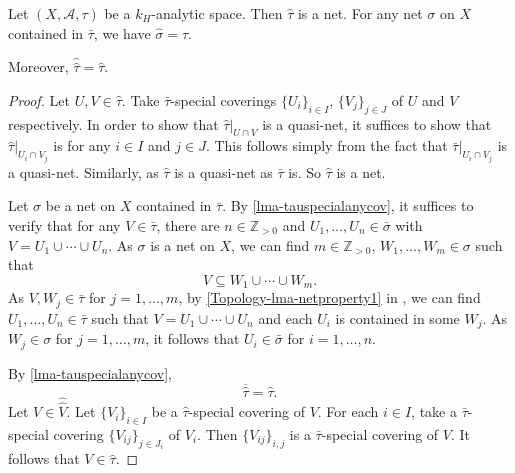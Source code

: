 \begin{proposition}\label{prop-tauhatbasic}
    Let  $(X,\mathcal{A},\tau)$ be a $k_H$-analytic space. Then $\hat{\tau}$ is a net. For any net $\sigma$ on $X$ contained in $\bar{\tau}$, we have $\hat{\sigma}=\hat{\tau}$.

    Moreover, $\hat{\hat{\tau}}=\hat{\tau}$.
\end{proposition}
\begin{proof}
    Let $U,V\in \hat{\tau}$. Take $\bar{\tau}$-special coverings $\{U_i\}_{i\in I}$, $\{V_j\}_{j\in J}$ of $U$ and $V$ respectively. In order to show that $\hat{\tau}|_{U\cap V}$ is a quasi-net, it suffices to show that $\hat{\tau}|_{U_i\cap V_j}$ is for any $i\in I$ and $j\in J$. This follows simply from the fact that $\bar{\tau}|_{U_i\cap V_j}$ is a quasi-net. Similarly, as $\hat{\tau}$ is a quasi-net as $\bar{\tau}$ is. So $\hat{\tau}$ is a net.

    Let $\sigma$ be a net on $X$ contained in $\bar{\tau}$. By \cref{lma-tauspecialanycov}, it suffices to verify that for any $V\in \bar{\tau}$, there are $n\in \mathbb{Z}_{>0}$ and $U_1,\ldots,U_n\in \bar{\sigma}$ with $V=U_1\cup \cdots \cup U_n$. As $\sigma$ is a net on $X$, we can find $m\in \mathbb{Z}_{>0}$, $W_1,\ldots,W_m\in \sigma$ such that
    \[
        V\subseteq W_1\cup \cdots\cup W_m.  
    \]
    As $V,W_j\in \bar{\tau}$ for $j=1,\ldots,m$, by \cref{Topology-lma-netproperty1} in , we can find $U_1,\ldots,U_n\in \bar{\tau}$ such that $V=U_1\cup\cdots\cup U_n$ and each $U_i$ is contained in some $W_j$. As $W_j\in \sigma$ for $j=1,\ldots,m$, it follows that $U_i\in \bar{\sigma}$ for $i=1,\ldots,n$.

    By \cref{lma-tauspecialanycov}, 
    \[
      \overline{\hat{\tau}} =\hat{\tau}. 
    \]
    Let $V\in \hat{\hat{V}}$.
    Let $\{V_i\}_{i\in I}$ be a $\hat{\tau}$-special covering of $V$. For each $i\in I$, take a $\bar{\tau}$-special covering $\{V_{ij}\}_{j\in J_i}$ of $V_i$. Then $\{V_{ij}\}_{i,j}$ is a $\bar{\tau}$-special covering of $V$. It follows that $V\in \hat{\tau}$.
\end{proof}

